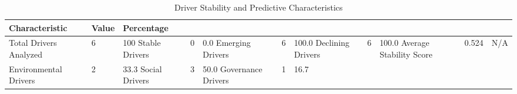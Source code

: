 \begin{table}
\caption{Driver Stability and Predictive Characteristics}
\label{tab:driver_characteristics}
\begin{tabular}{lll}
\toprule
Characteristic & Value & Percentage \\
\midrule
Total Drivers Analyzed & 6 & 100%
Stable Drivers & 0 & 0.0%
Emerging Drivers & 6 & 100.0%
Declining Drivers & 6 & 100.0%
Average Stability Score & 0.524 & N/A \\
Environmental Drivers & 2 & 33.3%
Social Drivers & 3 & 50.0%
Governance Drivers & 1 & 16.7%
\bottomrule
\end{tabular}
\end{table}
